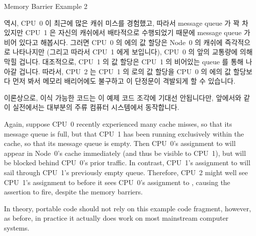 \begin{listing}
\scriptsize
{}
\caption{Memory Barrier Example 2}
\label{lst:app:whymb:Memory Barrier Example 2}
\end{listing}

역시, CPU~0 이 최근에 많은 캐쉬 미스를 경험했고, 따라서 message queue 가 꽉 차
있지만 CPU~1 은 자신의 캐쉬에서 배타적으로 수행되었기 때문에 message queue 가
비어 있다고 해봅시다.
그러면 CPU~0 의  에의 값 할당은 Node~0 의 캐쉬에 즉각적으로 나타나지만
(그리고 따라서 CPU~1 에게 보입니다), CPU~0 의 앞의 교통량에 의해 막힐 겁니다.
대조적으로, CPU~1 의  값 할당은 CPU~1 의 비어있는 queue 를 통해 나아갈
겁니다.
따라서, CPU~2 는 CPU~1 의  로의 값 할당을 CPU~0 의  에의 값
할당보다 먼저 봐서 메모리 배리어에도 불구하고 이 단정문이 격발되게 할 수
있습니다.

이론상으로, 이식 가능한 코드는 이 예제 코드 조각에 기대선 안됩니다만, 앞에서와
같이 실전에서는 대부분의 주류 컴퓨터 시스템에서 동작합니다.

\iffalse

Again, suppose CPU~0 recently experienced many cache misses, so that its
message queue is full, but that CPU~1 has been running exclusively within
the cache, so that its message queue is empty.
Then CPU~0's assignment to  will appear in Node~0's cache
immediately (and thus be visible to CPU~1), but will be blocked behind
CPU~0's prior traffic.
In contrast, CPU~1's assignment to  will sail through CPU~1's
previously empty queue.
Therefore, CPU~2 might well see CPU~1's assignment to  before
it sees CPU~0's assignment to , causing the assertion to fire,
despite the memory barriers.

In theory, portable code should not rely on this example code fragment,
however, as before, in practice it actually does work on most
mainstream computer systems.

